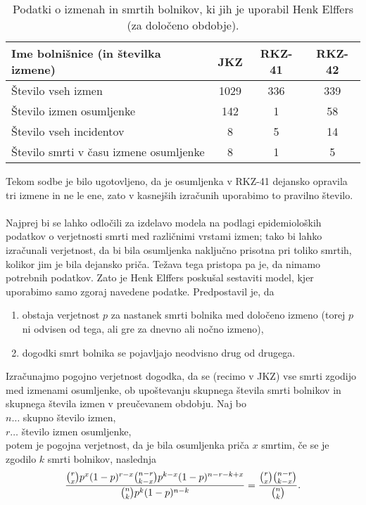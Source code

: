 \documentclass[mat1, tisk]{fmfdelo}
\theoremstyle{definition} %
\theoremstyle{trditev} %
\theoremstyle{izrek}
\begin{document}
\begin{table}[h!]
    \centering
    \caption{Podatki o izmenah in smrtih bolnikov, ki jih je uporabil Henk Elffers (za določeno obdobje).}
    \label{table:1}
     \begin{tabular}{l c c c}
        \hline
        Ime bolnišnice (in številka izmene) & JKZ  & RKZ-41 & RKZ-42 \\ 
        \hline
        Število vseh izmen & 1029 & 336 & 339 \\
        Število izmen osumljenke & 142 & 1 & 58 \\
        Število vseh incidentov & 8 & 5 & 14 \\
        Število smrti v času izmene osumljenke & 8 & 1 & 5 \\
        \hline
     \end{tabular}
 \end{table}
Tekom sodbe je bilo ugotovljeno, da je osumljenka v RKZ-41 dejansko opravila tri izmene in ne le ene, zato v kasnejših izračunih uporabimo to 
pravilno število.\\\\
Najprej bi se lahko odločili za izdelavo modela na podlagi epidemioloških podatkov o verjetnosti smrti med različnimi vrstami izmen; 
tako bi lahko izračunali verjetnost, da bi bila osumljenka naključno prisotna pri toliko smrtih, kolikor jim je bila dejansko priča. Težava 
tega pristopa pa je, da nimamo potrebnih podatkov. Zato je Henk Elffers poskušal sestaviti model, kjer uporabimo samo zgoraj navedene podatke. Predpostavil 
je, da
\begin{enumerate}
    \item obstaja verjetnost $p$ za nastanek smrti bolnika med določeno izmeno (torej $p$ ni odvisen od tega, ali gre za dnevno ali nočno izmeno),
    \item dogodki smrt bolnika se pojavljajo neodvisno drug od drugega.
\end{enumerate}
Izračunajmo pogojno verjetnost dogodka, da se (recimo v JKZ) vse smrti zgodijo med izmenami osumljenke, ob upoštevanju skupnega števila 
smrti bolnikov in skupnega števila izmen v preučevanem obdobju. Naj bo\\
$n \dots$ skupno število izmen,\\
$r \dots$ število izmen osumljenke, \\
potem je pogojna verjetnost, da je bila osumljenka priča $x$ smrtim, če se je zgodilo $k$ smrti bolnikov, naslednja 
\begin{equation}\label{eq:l_pogojna}
    \frac{\binom{r}{x}p^x(1-p)^{r-x}\binom{n-r}{k-x}p^{k-x}(1-p)^{n-r-k+x}}{\binom{n}{k}p^k(1-p)^{n-k}} = \frac{\binom{r}{x}\binom{n-r}{k-x}}{\binom{n}{k}}.\vspace{2mm}
\end{equation}
\end{document}
